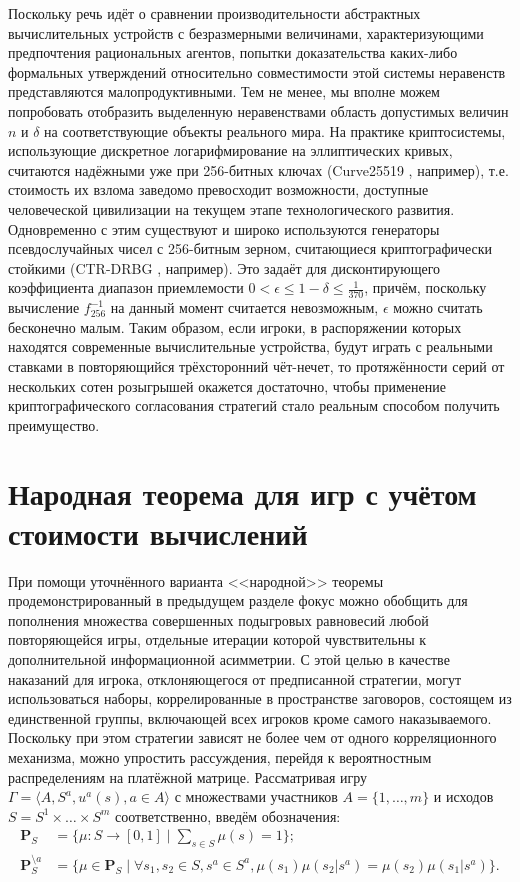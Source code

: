 Поскольку речь идёт о сравнении производительности абстрактных вычислительных устройств с безразмерными величинами, характеризующими предпочтения рациональных агентов, попытки доказательства каких-либо формальных утверждений относительно совместимости этой системы неравенств представляются малопродуктивными. Тем не менее, мы вполне можем попробовать отобразить выделенную неравенствами область допустимых величин $n$ и $\delta$ на соответствующие объекты реального мира. На практике криптосистемы, использующие дискретное логарифмирование на эллиптических кривых, считаются надёжными уже при 256-битных ключах (Curve25519 \cite{Bernstein}, например), т.е. стоимость их взлома заведомо превосходит возможности, доступные человеческой цивилизации на текущем этапе технологического развития. Одновременно с этим существуют и широко используются генераторы псевдослучайных чисел с 256-битным зерном, считающиеся криптографически стойкими (CTR-DRBG \cite{Hoang}, например). Это задаёт для дисконтирующего коэффициента диапазон приемлемости $0 < \epsilon \le 1 - \delta \le \frac{1}{370}$, причём, поскольку вычисление $f_{256}^{-1}$ на данный момент считается невозможным, $\epsilon$ можно считать бесконечно малым. Таким образом, если игроки, в распоряжении которых находятся современные вычислительные устройства, будут играть с реальными ставками в повторяющийся трёхсторонний чёт-нечет, то протяжённости серий от нескольких сотен розыгрышей окажется достаточно, чтобы применение криптографического согласования стратегий стало реальным способом получить преимущество.

\section{Народная теорема для игр с учётом стоимости вычислений}\label{sec:ch3/sect5}

При помощи уточнённого варианта <<народной>> теоремы продемонстрированный в предыдущем разделе фокус можно обобщить для пополнения множества совершенных подыгровых равновесий любой повторяющейся игры, отдельные итерации которой чувствительны к дополнительной информационной асимметрии. С этой целью в качестве наказаний для игрока, отклоняющегося от предписанной стратегии, могут использоваться наборы, коррелированные в пространстве заговоров, состоящем из единственной группы, включающей всех игроков кроме самого наказываемого. Поскольку при этом стратегии зависят не более чем от одного корреляционного механизма, можно упростить рассуждения, перейдя к вероятностным распределениям на платёжной матрице. Рассматривая игру $\Gamma = \langle A, S^a, u^a(s), a \in A \rangle$ с множествами участников $A = \{1, \ldots, m\}$ и исходов $S = S^1 \times \ldots \times S^m$ соответственно, введём обозначения:
\begin{align*}
	\mathbf{P}_S &= \{\mu : S \rightarrow [0, 1] \mid \sum_{s \in S} \mu(s) = 1\}; \\
	\mathbf{P}_S^{\setminus a} &= \{\mu \in \mathbf{P}_S \mid \forall s_1, s_2 \in S, s^a \in S^a, \mu(s_1) \mu(s_2 | s^a) = \mu(s_2) \mu(s_1 | s^a)\}.
\end{align*}

